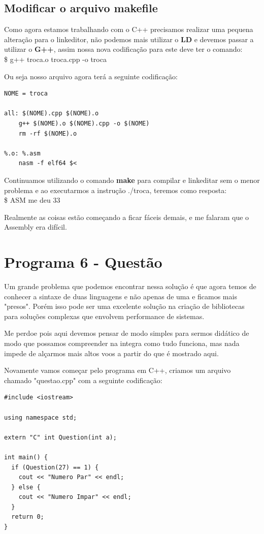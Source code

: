 \subsection{Modificar o arquivo makefile}
Como agora estamos trabalhando com o C++ precisamos realizar uma pequena alteração para o linkeditor, não podemos mais utilizar o \textbf{LD} e devemos passar a utilizar o \textbf{G++}, assim nossa nova codificação para este deve ter o comando: \\
{\ttfamily\$ g++ troca.o troca.cpp -o troca}

Ou seja nosso arquivo agora terá a seguinte codificação:
\begin{lstlisting}[]
NOME = troca

all: $(NOME).cpp $(NOME).o
	g++ $(NOME).o $(NOME).cpp -o $(NOME)
	rm -rf $(NOME).o

%.o: %.asm
	nasm -f elf64 $<	
\end{lstlisting}

Continuamos utilizando o comando \textbf{make} para compilar e linkeditar sem o menor problema e ao executarmos a instrução {\ttfamily ./troca}, teremos como resposta: \\
{\ttfamily\$ ASM me deu 33}

Realmente as coisas estão começando a ficar fáceis demais, e me falaram que o Assembly era difícil.

\section{Programa 6 - Questão}
Um grande problema que podemos encontrar nessa solução é que agora temos de conhecer a sintaxe de duas linguagens e não apenas de uma e ficamos mais "presos". Porém isso pode ser uma excelente solução na criação de bibliotecas para soluções complexas que envolvem performance de sistemas.

Me perdoe pois aqui devemos pensar de modo simples para sermos didático de modo que possamos compreender na integra como tudo funciona, mas nada impede de alçarmos mais altos voos a partir do que é mostrado aqui.

Novamente vamos começar pelo programa em C++, criamos um arquivo chamado "questao.cpp" com a seguinte codificação:
\begin{lstlisting}[]
#include <iostream>

using namespace std;

extern "C" int Question(int a);

int main() {
  if (Question(27) == 1) {
	cout << "Numero Par" << endl;
  } else {
	cout << "Numero Impar" << endl;
  }
  return 0;
}	
\end{lstlisting}

